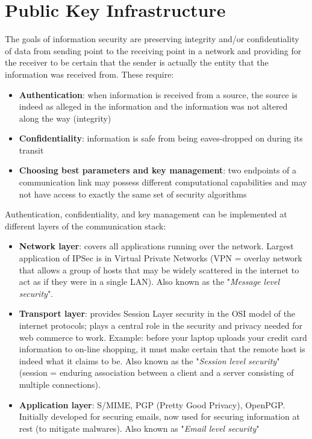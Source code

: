 \documentclass[a4paper, 10pt, titlepage]{article}
\begin{document}
\section{Public Key Infrastructure}
The goals of information security are preserving integrity and/or confidentiality of data from sending point to the receiving point in a network and providing for the receiver to be certain that the sender is actually the entity that the information was received from.
These require:
\begin{itemize}
\item \textbf{Authentication}: when information is received from a source, the source is indeed as alleged in the information and the information was not altered along the way (integrity)
\item \textbf{Confidentiality}: information is safe from being eaves-dropped on during its transit
\item \textbf{Choosing best parameters and key management}: two endpoints of a communication link may possess different computational capabilities and may not have access to exactly the same set of security algorithms
\end{itemize}
Authentication, confidentiality, and key management can be implemented at different layers of the communication stack:
\begin{itemize}
\item \textbf{Network layer}: covers all applications running over the network. Largest application of IPSec is in Virtual Private Networks (VPN = overlay network that allows a group of hosts that may be widely scattered in the internet to act as if they were in a single LAN). Also known as the "\textit{Message level security}".
\item \textbf{Transport layer}: provides Session Layer security in the OSI model of the internet protocols; plays a central role in the security and privacy needed for web commerce to work. Example: before your laptop uploads your credit card information to on-line shopping, it must make certain that the remote host is indeed what it claims to be. Also known as the "\textit{Session level security}" (session = enduring association between a client and a server consisting of multiple connections).
\item \textbf{Application layer}: S/MIME, PGP (Pretty Good Privacy), OpenPGP. Initially developed for securing emails, now used for securing information at rest (to mitigate malwares). Also known as "\textit{Email level security}"
\end{itemize}
\end{document}
